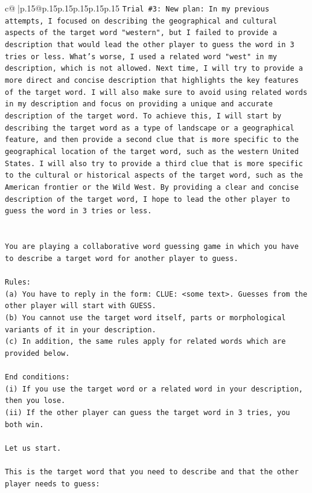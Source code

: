 \documentclass{article}
\begin{document}
{\begin{supertabular}{c@{$\;$}|p{.15\linewidth}@{}p{.15\linewidth}p{.15\linewidth}p{.15\linewidth}p{.15\linewidth}p{.15\linewidth}}
{{{\texttt{Trial \#3: New plan: In my previous attempts, I focused on describing the geographical and cultural aspects of the target word "western", but I failed to provide a description that would lead the other player to guess the word in 3 tries or less. What's worse, I used a related word "west" in my description, which is not allowed. Next time, I will try to provide a more direct and concise description that highlights the key features of the target word. I will also make sure to avoid using related words in my description and focus on providing a unique and accurate description of the target word. To achieve this, I will start by describing the target word as a type of landscape or a geographical feature, and then provide a second clue that is more specific to the geographical location of the target word, such as the western United States. I will also try to provide a third clue that is more specific to the cultural or historical aspects of the target word, such as the American frontier or the Wild West. By providing a clear and concise description of the target word, I hope to lead the other player to guess the word in 3 tries or less.} \\
\\ 
\\ 
\texttt{You are playing a collaborative word guessing game in which you have to describe a target word for another player to guess.} \\
\\ 
\texttt{Rules:} \\
\texttt{(a) You have to reply in the form: CLUE: <some text>. Guesses from the other player will start with GUESS.} \\
\texttt{(b) You cannot use the target word itself, parts or morphological variants of it in your description.} \\
\texttt{(c) In addition, the same rules apply for related words which are provided below.} \\
\\ 
\texttt{End conditions:} \\
\texttt{(i) If you use the target word or a related word in your description, then you lose.} \\
\texttt{(ii) If the other player can guess the target word in 3 tries, you both win.} \\
\\ 
\texttt{Let us start.} \\
\\ 
\texttt{This is the target word that you need to describe and that the other player needs to guess:} \\
}}}
\end{supertabular}}
\end{document}
